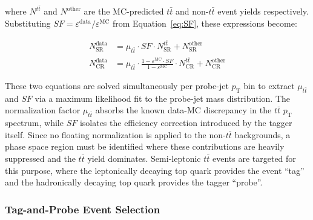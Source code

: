where $N^{t\bar{t}}$ and $N^{\text{other}}$ are the MC-predicted $t\bar{t}$ and non-$t\bar{t}$ event yields respectively. 
Substituting $SF = \varepsilon^{\text{data}} / \varepsilon^{\text{MC}}$ from Equation~\ref{eq:SF}, these expressions become:

\begin{align}
	N^{\text{data}}_{\text{SR}} &= \mu_{t\bar{t}} \cdot SF \cdot N^{t\bar{t}}_{\text{SR}} + N^{\text{other}}_{\text{SR}} \\
	N^{\text{data}}_{\text{CR}} &= \mu_{t\bar{t}} \cdot \frac{1 - \varepsilon^{\text{MC}} \cdot SF}{1 - \varepsilon^{\text{MC}}} \cdot N^{t\bar{t}}_{\text{CR}} + N^{\text{other}}_{\text{CR}}
\end{align}

These two equations are solved simultaneously per probe-jet $p_\text{T}$ bin to extract $\mu_{t\bar{t}}$ and $SF$ via a maximum likelihood fit to the probe-jet mass distribution.
The normalization factor $\mu_{t\bar{t}}$ absorbs the known data-MC discrepancy in the $t\bar{t}$ $p_\text{T}$ spectrum, while $SF$ isolates the efficiency correction introduced by the tagger itself. 
Since no floating normalization is applied to the non-$t\bar{t}$ backgrounds, a phase space region must be identified where these contributions are heavily suppressed and the $t\bar{t}$ yield dominates. 
Semi-leptonic $t\bar{t}$ events are targeted for this purpose, where the leptonically decaying top quark provides the event ``tag'' and the hadronically decaying top quark provides the tagger ``probe''.

\subsubsection{Tag-and-Probe Event Selection}


